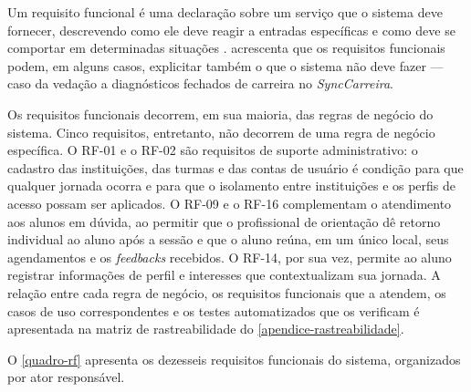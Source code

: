 Um requisito funcional é uma declaração sobre um serviço que o sistema deve fornecer, descrevendo como ele deve reagir a entradas específicas e como deve se comportar em determinadas situações \cite{pressman2021}.  acrescenta que os requisitos funcionais podem, em alguns casos, explicitar também o que o sistema não deve fazer — caso da vedação a diagnósticos fechados de carreira no \textit{SyncCarreira}.

Os requisitos funcionais decorrem, em sua maioria, das regras de negócio do sistema. Cinco requisitos, entretanto, não decorrem de uma regra de negócio específica. O RF-01 e o RF-02 são requisitos de suporte administrativo: o cadastro das instituições, das turmas e das contas de usuário é condição para que qualquer jornada ocorra e para que o isolamento entre instituições e os perfis de acesso possam ser aplicados. O RF-09 e o RF-16 complementam o atendimento aos alunos em dúvida, ao permitir que o profissional de orientação dê retorno individual ao aluno após a sessão e que o aluno reúna, em um único local, seus agendamentos e os \textit{feedbacks} recebidos. O RF-14, por sua vez, permite ao aluno registrar informações de perfil e interesses que contextualizam sua jornada. A relação entre cada regra de negócio, os requisitos funcionais que a atendem, os casos de uso correspondentes e os testes automatizados que os verificam é apresentada na matriz de rastreabilidade do \autoref{apendice-rastreabilidade}.

O \autoref{quadro-rf} apresenta os dezesseis requisitos funcionais do sistema, organizados por ator responsável.

